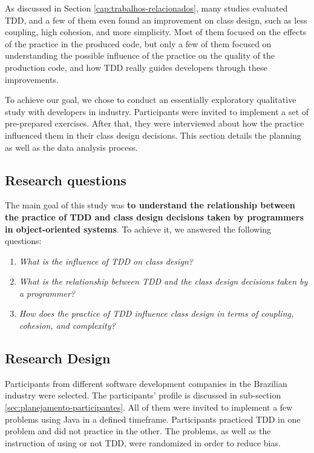 \documentclass[times]{speauth}
\begin{document}
As discussed in Section \ref{cap:trabalhos-relacionados}, many studies evaluated
TDD, and a few of them even found an improvement on class design, such as
less coupling, high cohesion, and more simplicity. Most of them focused on
the effects of the practice in the produced code, but only a few of them focused on understanding
the possible influence of the practice on the quality of the production code, 
and how TDD really guides developers through these improvements.

To achieve our goal, we chose to conduct an essentially 
exploratory qualitative study with developers in industry. Participants
were invited to implement a set of pre-prepared exercises. After that,
they were interviewed about how the practice influenced them in their
class design decisions. This section details the planning as well as
the data analysis process.


\subsection{Research questions}

The main goal of this study was \textbf{to understand the relationship between
the practice of TDD and class design decisions taken by programmers in object-oriented
systems}. To achieve it, we answered the following questions:

\begin{enumerate}

	\item \textit{What is the influence of TDD on class design?}

	\item \textit{What is the relationship between TDD and the class design decisions taken
	by a programmer?}

	\item \textit{How does the practice of TDD influence class design in terms of coupling, 
	cohesion, and complexity?}

\end{enumerate}

\subsection{Research Design}

Participants from different software development companies in the Brazilian
industry were selected. The participants' profile is discussed in sub-section
\ref{sec:planejamento-participantes}. All of them were invited to implement
a few problems using Java in a defined timeframe. Participants practiced
TDD in one problem and did not practice in the other. The problems,
as well as the instruction of using or not TDD, were
randomized in order to reduce bias.
\end{document}
